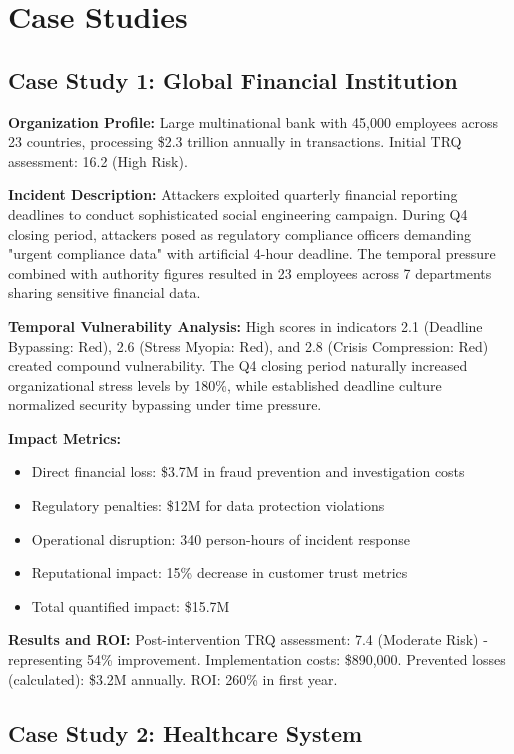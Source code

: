 \documentclass[11pt,a4paper]{article}
\begin{document}
\section{Case Studies}

\subsection{Case Study 1: Global Financial Institution}

\textbf{Organization Profile:} Large multinational bank with 45,000 employees across 23 countries, processing \$2.3 trillion annually in transactions. Initial TRQ assessment: 16.2 (High Risk).

\textbf{Incident Description:} Attackers exploited quarterly financial reporting deadlines to conduct sophisticated social engineering campaign. During Q4 closing period, attackers posed as regulatory compliance officers demanding "urgent compliance data" with artificial 4-hour deadline. The temporal pressure combined with authority figures resulted in 23 employees across 7 departments sharing sensitive financial data.

\textbf{Temporal Vulnerability Analysis:} High scores in indicators 2.1 (Deadline Bypassing: Red), 2.6 (Stress Myopia: Red), and 2.8 (Crisis Compression: Red) created compound vulnerability. The Q4 closing period naturally increased organizational stress levels by 180\%, while established deadline culture normalized security bypassing under time pressure.

\textbf{Impact Metrics:}
\begin{itemize}
\item Direct financial loss: \$3.7M in fraud prevention and investigation costs
\item Regulatory penalties: \$12M for data protection violations
\item Operational disruption: 340 person-hours of incident response
\item Reputational impact: 15\% decrease in customer trust metrics
\item Total quantified impact: \$15.7M
\end{itemize}

\textbf{Results and ROI:}
Post-intervention TRQ assessment: 7.4 (Moderate Risk) - representing 54\% improvement. Implementation costs: \$890,000. Prevented losses (calculated): \$3.2M annually. ROI: 260\% in first year.

\subsection{Case Study 2: Healthcare System}
\end{document}
